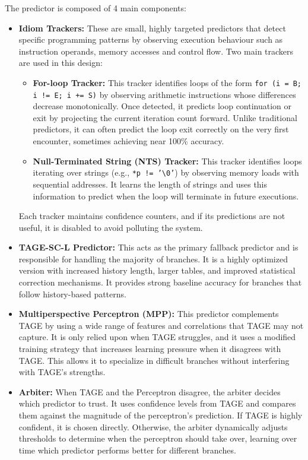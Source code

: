 \documentclass[11pt,a4paper]{article}
\begin{document}
The predictor is composed of 4 main components:
\begin{itemize}
        \item \textbf{Idiom Trackers: }These are small, highly targeted predictors that detect specific programming patterns by observing execution behaviour such as instruction operands, memory accesses and control flow.
        Two main trackers are used in this design:

        \begin{itemize}
                \item \textbf{For-loop Tracker: }This tracker identifies loops of the form \texttt{for (i = B; i != E; i += S)} by observing arithmetic instructions whose differences decrease monotonically.
                Once detected, it predicts loop continuation or exit by projecting the current iteration count forward.
                Unlike traditional predictors, it can often predict the loop exit correctly on the very first encounter, sometimes achieving near 100\% accuracy.
                \item \textbf{Null-Terminated String (NTS) Tracker: }This tracker identifies loops iterating over strings (e.g., \texttt{*p != '\textbackslash 0'}) by observing memory loads with sequential addresses.
                It learns the length of strings and uses this information to predict when the loop will terminate in future executions.
        \end{itemize}
        
        Each tracker maintains confidence counters, and if its predictions are not useful, it is disabled to avoid polluting the system.        
        \item \textbf{TAGE-SC-L Predictor: }This acts as the primary fallback predictor and is responsible for handling the majority of branches.
        It is a highly optimized version with increased history length, larger tables, and improved statistical correction mechanisms.
        It provides strong baseline accuracy for branches that follow history-based patterns.   
        \item \textbf{Multiperspective Perceptron (MPP): }This predictor complements TAGE by using a wide range of features and correlations that TAGE may not capture.
        It is only relied upon when TAGE struggles, and it uses a modified training strategy that increases learning pressure when it disagrees with TAGE.
        This allows it to specialize in difficult branches without interfering with TAGE's strengths.   
        \item \textbf{Arbiter: }When TAGE and the Perceptron disagree, the arbiter decides which predictor to trust.
        It uses confidence levels from TAGE and compares them against the magnitude of the perceptron’s prediction.
        If TAGE is highly confident, it is chosen directly.
        Otherwise, the arbiter dynamically adjusts thresholds to determine when the perceptron should take over, learning over time which predictor performs better for different branches.
\end{itemize}
\end{document}
